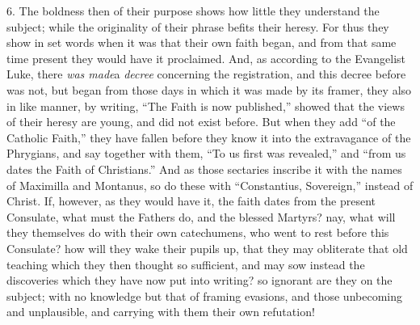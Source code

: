 6. The boldness then of their
purpose shows how little they understand the subject; while the
originality of their phrase befits their heresy. For thus they show in
set words when it was that their own faith began, and from that same
time present they would have it proclaimed. And, as according to the
Evangelist Luke, there \emph{was made}a \emph{decree} concerning the
registration, and this decree before was not, but began from those
days in which it was made by its framer, they also in like manner, by
writing, ``The Faith is now published,'' showed that the views of their
heresy are young, and did not exist before. But when they add ``of the
Catholic Faith,'' they have fallen before they know it into the
extravagance of the Phrygians, and say together with them, ``To us
first was revealed,'' and ``from us dates the Faith of Christians.'' And
as those sectaries inscribe it with the names of Maximilla and
Montanus, so do these with ``Constantius, Sovereign,'' instead of
Christ. If, however, as they would have it, the faith dates from the
present Consulate, what must the Fathers do, and the blessed Martyrs?
nay, what will they themselves do with their own catechumens, who went
to rest before this Consulate? how will they wake their pupils up,
that they may obliterate that old teaching which they then thought so
sufficient, and may sow instead the discoveries which they have now
put into writing? so ignorant are they on the subject; with no
knowledge but that of framing evasions, and those unbecoming and
unplausible, and carrying with them their own refutation!

